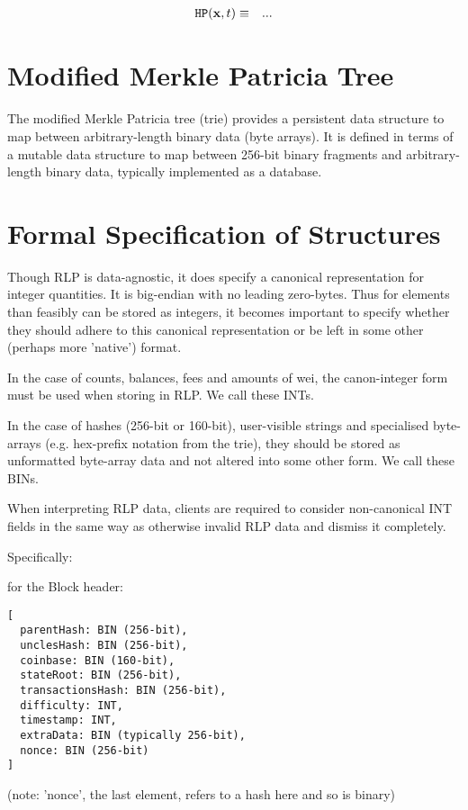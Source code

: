 \documentclass[9pt,oneside]{amsart}
\begin{document}
\begin{eqnarray}
\mathtt{\tiny HP}(\mathbf{x}, t) & \equiv & ...
\end{eqnarray}



\section{Modified Merkle Patricia Tree}\label{app:trie}
The modified Merkle Patricia tree (trie) provides a persistent data structure to map between arbitrary-length binary data (byte arrays). It is defined in terms of a mutable data structure to map between 256-bit binary fragments and arbitrary-length binary data, typically implemented as a database.

\section{Formal Specification of Structures}
Though RLP is data-agnostic, it does specify a canonical representation for integer quantities. It is big-endian with no leading zero-bytes. Thus for elements than feasibly can be stored as integers, it becomes important to specify whether they should adhere to this canonical representation or be left in some other (perhaps more 'native') format.

In the case of counts, balances, fees and amounts of wei, the canon-integer form must be used when storing in RLP. We call these INTs.

In the case of hashes (256-bit or 160-bit), user-visible strings and specialised byte-arrays (e.g. hex-prefix notation from the trie), they should be stored as unformatted byte-array data and not altered into some other form. We call these BINs.

When interpreting RLP data, clients are required to consider non-canonical INT fields in the same way as otherwise invalid RLP data and dismiss it completely.

Specifically:

for the Block header:
\begin{verbatim}
[
  parentHash: BIN (256-bit),
  unclesHash: BIN (256-bit),
  coinbase: BIN (160-bit),
  stateRoot: BIN (256-bit),
  transactionsHash: BIN (256-bit),
  difficulty: INT,
  timestamp: INT,
  extraData: BIN (typically 256-bit),
  nonce: BIN (256-bit)
]
\end{verbatim}

(note: 'nonce', the last element, refers to a hash here and so is binary)
\end{document}
